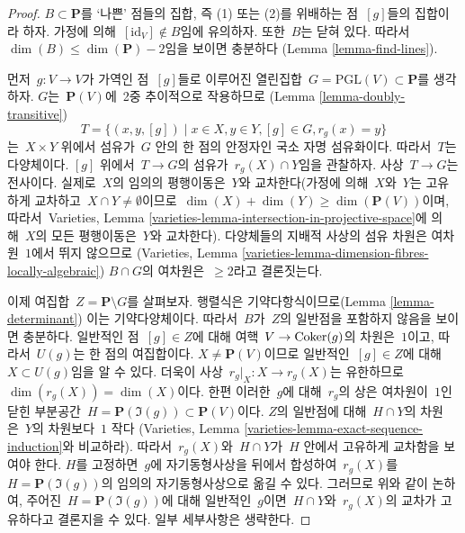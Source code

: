 \begin{proof}
$B \subset \mathbf{P}$를 ‘나쁜’ 점들의 집합, 즉 (1) 또는 (2)를
위배하는 점\  $[g]$들의 집합이라 하자. 가정에 의해\ 
$[\text{id}_V] \not \in B$임에 유의하자. 또한\  $B$는 닫혀 있다.
따라서\  $\dim(B) \leq \dim(\mathbf{P}) - 2$임을 보이면 충분하다
(Lemma \ref{lemma-find-lines}).

\medskip\noindent
먼저\  $g : V \to V$가 가역인 점\  $[g]$들로 이루어진 열린집합\ 
$G = \text{PGL}(V) \subset \mathbf{P}$를 생각하자.
$G$는\  $\mathbf{P}(V)$에\  2중 추이적으로 작용하므로
(Lemma \ref{lemma-doubly-transitive})
$$
T = \{(x, y, [g]) \mid x \in X, y \in Y, [g] \in G, r_g(x) = y\}
$$
는\  $X \times Y$ 위에서 섬유가\  $G$ 안의 한 점의 안정자인
국소 자명 섬유화이다. 따라서\  $T$는 다양체이다.
$[g]$ 위에서\  $T \to G$의 섬유가\  $r_g(X) \cap Y$임을 관찰하자.
사상\  $T \to G$는 전사이다. 실제로\  $X$의 임의의 평행이동은\ 
$Y$와 교차한다(가정에 의해\  $X$와\  $Y$는 고유하게 교차하고\ 
$X \cap Y \not = \emptyset$이므로\ 
$\dim(X) + \dim(Y) \geq \dim(\mathbf{P}(V))$이며, 따라서\ 
Varieties, Lemma
\ref{varieties-lemma-intersection-in-projective-space}에 의해\ 
$X$의 모든 평행이동은\  $Y$와 교차한다).
다양체들의 지배적 사상의 섬유 차원은 여차원\  $1$에서 뛰지 않으므로
(Varieties, Lemma
\ref{varieties-lemma-dimension-fibres-locally-algebraic})
$B \cap G$의 여차원은\  $\geq 2$라고 결론짓는다.

\medskip\noindent
이제 여집합\  $Z = \mathbf{P} \setminus G$를 살펴보자.
행렬식은 기약다항식이므로(Lemma \ref{lemma-determinant})
이는 기약다양체이다. 따라서\  $B$가\  $Z$의 일반점을 포함하지 않음을
보이면 충분하다. 일반적인 점\  $[g] \in Z$에 대해 여핵\ 
$V \to \mathop{\mathrm{Coker}}(g)$의 차원은\  $1$이고, 따라서\  $U(g)$는 한 점의
여집합이다. $X \not = \mathbf{P}(V)$이므로 일반적인\ 
$[g] \in Z$에 대해\  $X \subset U(g)$임을 알 수 있다.
더욱이 사상\  $r_g|_X : X \to r_g(X)$는 유한하므로\ 
$\dim(r_g(X)) = \dim(X)$이다.
한편 이러한\  $g$에 대해\  $r_g$의 상은 여차원이\  $1$인 닫힌 부분공간\ 
$H = \mathbf{P}(\Im(g)) \subset \mathbf{P}(V)$이다.
$Z$의 일반점에 대해\  $H \cap Y$의 차원은\  $Y$의 차원보다\  $1$ 작다
(Varieties, Lemma
\ref{varieties-lemma-exact-sequence-induction}와 비교하라).
따라서\  $r_g(X)$와\  $H \cap Y$가\  $H$ 안에서 고유하게 교차함을
보여야 한다. $H$를 고정하면\  $g$에 자기동형사상을 뒤에서 합성하여\ 
$r_g(X)$를\  $H = \mathbf{P}(\Im(g))$의 임의의 자기동형사상으로
옮길 수 있다. 그러므로 위와 같이 논하여, 주어진\ 
$H = \mathbf{P}(\Im(g))$에 대해 일반적인\  $g$이면\ 
$H \cap Y$와\  $r_g(X)$의 교차가 고유하다고 결론지을 수 있다.
일부 세부사항은 생략한다.
\end{proof}








